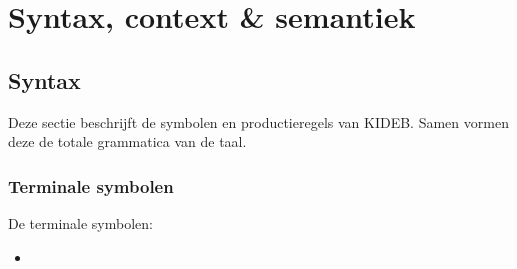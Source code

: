 \chapter{Syntax, context \& semantiek}
    \label{chap:syntax_context_en_semantiek}
\section{Syntax}
Deze sectie beschrijft de symbolen en productieregels van KIDEB. Samen vormen deze de totale grammatica van de taal.
\subsection{Terminale symbolen}
De terminale symbolen:
\begin{itemize}
    \item \itab{}
\end{itemize}

